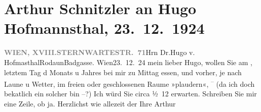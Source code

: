 

         
         \renewcommand{\erwaehntePersonen}{Personen: Hugo von Hofmannsthal}
         \renewcommand{\erwaehnteOrte}{Orte: Badgasse, Rodaun, Sternwartestraße, Wien, XVIII., Währing}
         \renewcommand{\erwaehnteWerke}{}
               \section[Arthur Schnitzler an Hugo Hofmannsthal, 23. 12. 1924]{ Arthur Schnitzler an Hugo Hofmannsthal, 23. 12. 1924}\nopagebreak{}\rehead{ }\begin{ledgroupsized}[t]{13cm}\normalsize\beginnumbering{} \toendnotes[C]{\smallbreak\pagebreak[2]} 
\toendnotes[C]{\smallbreak}\pstart{}{\pb}\label{T_L02424-1v}\label{T_L02424-1h}\pend{}\pstart{}\textcolor{gray}{\textbf{WIEN, XVIII.}}\pend{}\pstart{}\textcolor{gray}{\textbf{STERNWARTESTR. 71}}\pend{}{\bigskip}\pstart{}Hrn Dr.\pend{}\pstart{}Hugo v. Hofma{\geminationn}sthal\pend{}\pstart{}Rodaun\pend{}\pstart{}Badgasse.\pend{}{\bigskip}\pstart
           \raggedleft{}{\pb}Wien23. 12. 24\pend
           \pstart
           mein lieber Hugo, wollen Sie am \label{K_L02424-1v}\label{K_L02424-1h}, letztem Tag d Monats u Jahres bei mir zu Mittag essen, und vorher, je nach Laune u
               Wetter, im freien oder geschlossenen Raume »plaudern«, \substVorne{}\textsuperscript{– }\substDazwischen{}(\substHinten{}da ich doch beka{\geminationn}tlich ein solcher bin –?) Ich
               würd {\pb}Sie circa ½ 12 erwarten. Schreiben Sie
               mir eine Zeile, ob ja. Herzlichst wie allezeit der Ihre\pend
           \pstart \spacefill\mbox{Arthur}\pend{}
         
         \endnumbering{}\end{ledgroupsized}  \newcommand{\dateiname}{L02424}\newcommand{\titel}{Arthur Schnitzler an Hugo Hofmannsthal, 23. 12. 1924}\newcommand{\editorInnen}{Martin Anton Müller und Gerd-Hermann Susen}
      